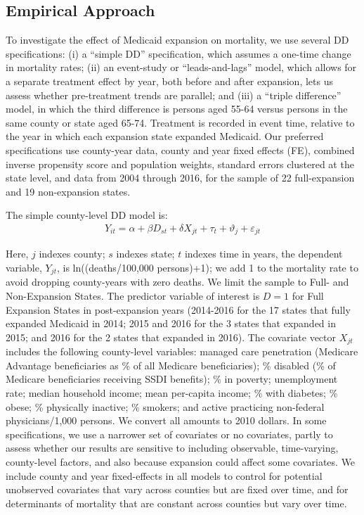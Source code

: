 \documentclass[12pt]{article}%
\begin{document}
\subsection{Empirical Approach}\label{sec:empirical_approach}

To investigate the effect of Medicaid expansion on mortality, we use several DD specifications:  (i) a ``simple DD'' specification, which assumes a one-time change in mortality rates; (ii) an event-study or ``leads-and-lags'' model, which allows for a separate treatment effect by year, both before and after expansion, lets us assess whether pre-treatment trends are parallel; and (iii) a ``triple difference'' model, in which the third difference is persons aged 55-64 versus persons in the same county or state aged 65-74.  
Treatment is recorded in event time, relative to the year in which each expansion state expanded Medicaid. 
Our preferred specifications use county-year data, county and year fixed effects (FE), combined inverse propensity score and population weights, standard errors clustered at the state level, and data from 2004 through 2016, for the sample of 22 full-expansion and 19 non-expansion states.

The simple county-level DD model is:
\vspace{-.5cm}
\begin{align}
    Y_{it}=\alpha + \beta D_{st} + \delta X_{jt} + \tau_{t} + \vartheta_{j} + \varepsilon_{jt} \label{eq:dd}
\end{align}

Here, $j$ indexes county; $s$ indexes state; $t$ indexes time in years, the dependent variable, $Y_{jt}$, is ln((deaths/100,000 persons)+1); we add 1 to the mortality rate to avoid dropping county-years with zero deaths.   
We limit the sample to Full- and Non-Expansion States. 
The predictor variable of interest is $D = 1$ for Full Expansion States in post-expansion years (2014-2016  for the 17 states that fully expanded Medicaid in 2014; 2015 and 2016 for the 3 states that expanded in 2015; and 2016 for the 2 states that expanded in 2016).  
The covariate vector $X_{jt}$ includes the following county-level variables: 
managed care penetration (Medicare Advantage beneficiaries as \% of all Medicare beneficiaries); 
\% disabled (\% of Medicare beneficiaries receiving SSDI benefits); \% in poverty; unemployment rate; 
median household income; mean per-capita income; \% with diabetes; \% obese; \% physically inactive; \% smokers; and active practicing non-federal physicians/1,000 persons. 
We convert all amounts to 2010 dollars.  
In some specifications, we use a narrower set of covariates or no covariates, partly to assess whether our results are sensitive to including observable, time-varying, county-level factors, and also because expansion could affect some covariates. We include county and year fixed-effects in all models to control for potential unobserved covariates that vary across counties but are fixed over time, and for determinants of mortality that are constant across counties but vary over time. 
\end{document}
